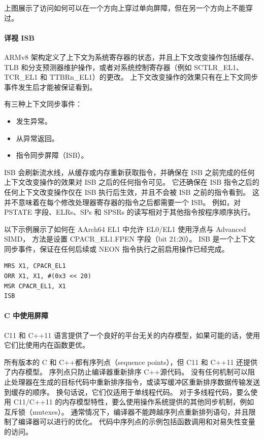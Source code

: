 
上图展示了访问如何可以在一个方向上穿过单向屏障，但在另一个方向上不能穿过。

\paragraph{详视 ISB}

ARMv8 架构定义了上下文为系统寄存器的状态，并且上下文改变操作包括缓存、TLB 和分支预测器维护操作，或者对系统控制寄存器（例如 SCTLR\_EL1、TCR\_EL1 和 TTBRn\_EL1）的更改。
上下文改变操作的效果只有在上下文同步事件发生后才能被保证看到。

有三种上下文同步事件：

\begin{itemize}
\item
  发生异常。
\item
  从异常返回。
\item
  指令同步屏障（ISB）。
\end{itemize}

ISB 会刷新流水线，从缓存或内存重新获取指令，并确保在 ISB 之前完成的任何上下文改变操作的效果对 ISB 之后的任何指令可见。
它还确保在 ISB 指令之后的任何上下文改变操作仅在 ISB 执行后生效，并且不会被 ISB 之前的指令看到。
这并不意味着在每个修改处理器寄存器的指令之后都需要一个 ISB。
例如，对 PSTATE 字段、ELRs、SPs 和 SPSRs 的读写相对于其他指令按程序顺序执行。

以下示例展示了如何在 AArch64 EL1 中允许 EL0/EL1 使用浮点与 Advanced SIMD，
方法是设置 CPACR\_EL1.FPEN 字段（bit 21:20）。
ISB 是一个上下文同步事件，保证在任何后续或 NEON 指令执行之前启用操作已经完成。

\begin{lstlisting}
MRS X1, CPACR_EL1
ORR X1, X1, #(0x3 << 20)
MSR CPACR_EL1, X1
ISB
\end{lstlisting}

\paragraph{C 中使用屏障}

C11 和 C++11 语言提供了一个良好的平台无关的内存模型，如果可能的话，使用它们比使用内在函数更优。

所有版本的 C 和 C++都有序列点（sequence points），但 C11 和 C++11 还提供了内存模型。
序列点只防止编译器重新排序 C++源代码。
没有任何机制可以阻止处理器在生成的目标代码中重新排序指令，或读写缓冲区重新排序数据传输发送到缓存的顺序。
换句话说，它们仅适用于单线程代码。
对于多线程代码，要么使用 C11/C++11 的内存模型特性，要么使用操作系统提供的其他同步机制，例如互斥锁（mutexes）。
通常情况下，编译器不能跨越序列点重新排列语句，并且限制了编译器可以进行的优化。
代码中序列点的示例包括函数调用和对易失性变量的访问。

